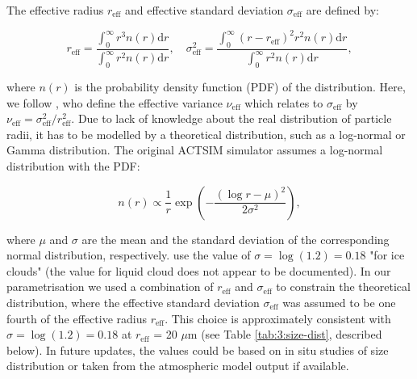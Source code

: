The effective radius $r_\text{eff}$ and effective standard deviation $\sigma_\text{eff}$
are defined by:

\begin{equation}
\label{eq:eff}
r_\text{eff} = \frac{\int_0^\infty r^3 n(r)\mathrm{d}r}{\int_0^\infty r^2 n(r)\mathrm{d}r}, \quad
\sigma_\text{eff}^2 = \frac{\int_0^\infty (r - r_\text{eff})^2 r^2 n(r) \mathrm{d}r}{\int_0^\infty r^2 n(r) \mathrm{d}r} ,
\end{equation}

where $n(r)$ is the probability density function (PDF) of the distribution.
Here, we follow \cite{petty2011}, who define the effective variance
$\nu_\text{eff}$ which relates to $\sigma_\text{eff}$
by $\nu_\text{eff} = \sigma_\text{eff}^2 / r_\text{eff}^2$.
Due to lack of knowledge about the real distribution of particle radii, it has to be modelled by a
theoretical distribution, such as a log-normal or Gamma distribution.
The original ACTSIM simulator assumes a log-normal distribution \citep{chiriaco2006}
with the PDF:

\begin{equation}
n(r) \propto \frac{1}{r}\exp\left(-\frac{(\log r - \mu)^2}{2\sigma^2}\right) ,
\end{equation}

where $\mu$ and $\sigma$ are the mean and the standard
deviation of the corresponding normal distribution, respectively.
\cite{chiriaco2006} use the value of $\sigma = \log(1.2) = 0.18$ "for ice clouds" (the value
for liquid cloud does not appear to be documented). In our parametrisation
we used a combination of $r_\text{eff}$ and $\sigma_\text{eff}$
to constrain the theoretical distribution, where the effective standard deviation $\sigma_\text{eff}$ was assumed to
be one fourth of the effective radius $r_\text{eff}$. This choice is approximately
consistent with $\sigma = \log(1.2) = 0.18$ at $r_\text{eff}$ = 20 $\mu$m
(see Table \ref{tab:3:size-dist}, described below). In future updates, the values
could be based on in situ studies of size distribution or taken from the
atmospheric model output if available.

